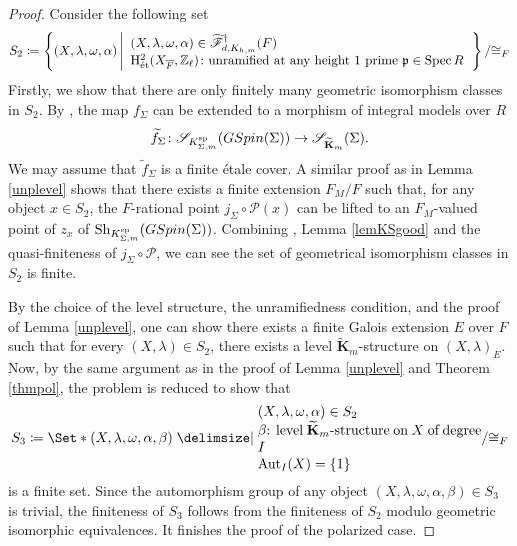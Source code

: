 \documentclass[11pt,reqno,oneside]{amsart}
\numberwithin{equation}{section}
\theoremstyle{definition}
\DeclareMathOperator{\Aut}{Aut}
\DeclareMathOperator{\Spec}{Spec}
\newcommand{\GSpin}{{\rm GSpin}}
\DeclareMathOperator{\et}{\Acute{e}t}
\newcommand{\Sh}{\mathrm{Sh}}
\newcommand{\scF}{\mathscr{F}}
\newcommand{\scS}{\mathscr{S}}
\newcommand\rH{\mathrm{H}}
\newcommand{\ZZ}{\mathbb{Z}}
\newcommand{\p}{\mathfrak{p}}
\DeclareMathOperator{\Sp}{sp}
\begin{document}
\begin{proof}
Consider the following set 
\[
S_{2}\coloneqq
\left\{
  (X, \lambda, \omega, \alpha) \left|
  \begin{array}{l}
(X, \lambda, \omega, \alpha) \in  \widetilde{\scF}^{\dag}_{d,K_{h,m}}(F) \\
 \rH^{2}_{\et}(X_{\overline{F}},\ZZ_{\ell}) \colon 
  \text{unramified at any height 1 prime } \p\in \Spec R 
  \end{array}
  \right.
\right\}/{\cong_F}
\]
Firstly, we show that there are only finitely many geometric isomorphism classes in $S_2$.
By \cite[Section 2, Section 3]{Kisin-IntegralModel}, the map $f_{\Sigma}$ can be extended to a morphism of integral models over $R$
\[
\widetilde{f}_{\Sigma}\colon \scS_{K^{\Sp}_{\Sigma,m}}(\GSpin(\Sigma)) \rightarrow \scS_{\widetilde{\mathbf{K}}_m}(\Sigma).
\]
We may assume that $\widetilde{f}_{\Sigma}$ is a finite \'{e}tale cover.
A similar proof as in Lemma \ref{unplevel} shows that there exists a finite extension $F_{M}/F$ such that, for any object $x \in S_{2}$, the $F$-rational point $j_{\Sigma} \circ \mathcal{P}(x)$ can be lifted to an $F_{M}$-valued point of $z_{x}$ of $\Sh_{K^{\Sp}_{\Sigma,m}}(\GSpin(\Sigma))$.
Combining \cite[VI, \S1, Theorem 2]{Faltings1992}, Lemma \ref{lemKSgood} and the quasi-finiteness of $j_{\Sigma} \circ \mathcal{P}$, we can see the set of geometrical isomorphism classes in $S_2$ is finite.

By the choice of the level structure, the unramifiedness condition, and the proof of Lemma \ref{unplevel}, one can show there exists a finite Galois extension $E$ over $F$ such that for every $(X,\lambda) \in S_{2}$, there exists a level $\widetilde{\mathbf{K}}_m$-structure on $(X,\lambda)_{E}$. Now, by the same argument as in the proof of Lemma \ref{unplevel} and Theorem \ref{thmpol}, the problem is reduced to show that
\[
S_3\coloneqq
\Set*{
  (X, \lambda, \omega, \alpha,\beta) \given 
\parbox{16em}{
$(X, \lambda, \omega, \alpha) \in S_2$ \\
$\beta$: level $\widetilde{\mathbf{K}}_m$-structure on  $X$  of degree  $I$ \\
$\Aut_{I}(X)=\{1\}$}
  }/{\cong_F}
\]
is a finite set.
Since the automorphism group of any object $(X, \lambda, \omega, \alpha,\beta) \in S_3$ is trivial, the finiteness of $S_3$ follows from the finiteness of $S_{2}$ modulo geometric isomorphic equivalences. It finishes the proof of the polarized case.


\end{proof}
\end{document}
